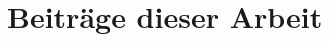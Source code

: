 \documentclass[german,version-2020-11]{uzl-thesis}
\begin{document}
      


      
   







%  
%  
%
%




  
    



  

  

  





\section{Beiträge dieser Arbeit}
\end{document}
